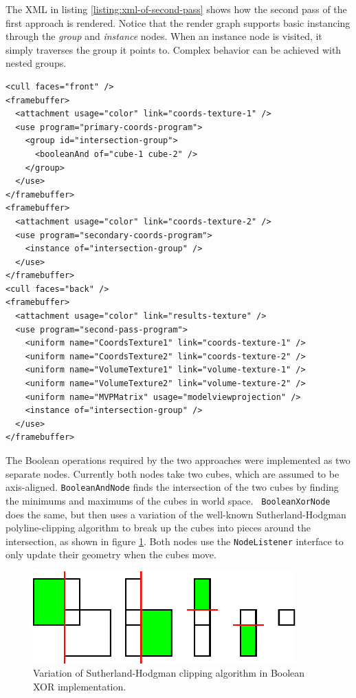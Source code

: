 \documentclass{report}
\begin{document}
The XML in listing \ref{listing:xml-of-second-pass} shows how the second pass of
the first approach is rendered.  Notice that the render graph supports basic
instancing through the {\em group} and {\em instance} nodes.  When an instance
node is visited, it simply traverses the group it points to.  Complex behavior
can be achieved with nested groups.

\lstset{language=XML}
\lstset{markfirstintag=true}
\lstset{showstringspaces=false}
\lstset{caption=XML of second pass for first approach.}
\lstset{label=listing:xml-of-second-pass}
\begin{lstlisting}[frame=single,float]
<cull faces="front" />
<framebuffer>
  <attachment usage="color" link="coords-texture-1" />
  <use program="primary-coords-program">
    <group id="intersection-group">
      <booleanAnd of="cube-1 cube-2" />
    </group>
  </use>
</framebuffer>
<framebuffer>
  <attachment usage="color" link="coords-texture-2" />
  <use program="secondary-coords-program">
    <instance of="intersection-group" />
  </use>
</framebuffer>
<cull faces="back" />
<framebuffer>
  <attachment usage="color" link="results-texture" />
  <use program="second-pass-program">
    <uniform name="CoordsTexture1" link="coords-texture-1" />
    <uniform name="CoordsTexture2" link="coords-texture-2" />
    <uniform name="VolumeTexture1" link="volume-texture-1" />
    <uniform name="VolumeTexture2" link="volume-texture-2" />
    <uniform name="MVPMatrix" usage="modelviewprojection" />
    <instance of="intersection-group" />
  </use>
</framebuffer>
\end{lstlisting}

The Boolean operations required by the two approaches were implemented as two
separate nodes.  Currently both nodes take two cubes, which are assumed to be
axis-aligned.  {\tt BooleanAndNode} finds the intersection of the two cubes by
finding the minimums and maximums of the cubes in world space.  {\tt
BooleanXorNode} does the same, but then uses a variation of the well-known
Sutherland-Hodgman polyline-clipping algorithm to break up the cubes into pieces
around the intersection, as shown in figure \ref{clipping}.  Both nodes use the
{\tt NodeListener} interface to only update their geometry when the cubes move.

\begin{figure}
\centering
\includegraphics[width=0.9\textwidth]{clipping.pdf}
\caption{Variation of Sutherland-Hodgman clipping algorithm in Boolean XOR
implementation.}
\label{clipping}
\end{figure}
\end{document}
